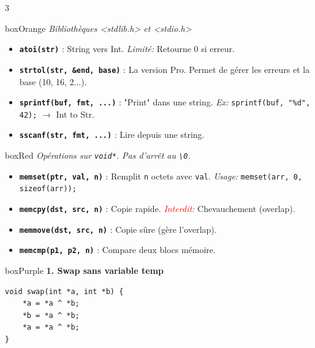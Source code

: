 \documentclass[10pt,landscape,a4paper]{article}
\begin{document}
\begin{multicols*}{3}
\begin{mybox}[CONVERSIONS]{boxOrange}
    \textit{Bibliothèques <stdlib.h> et <stdio.h>}
    \begin{itemize}[leftmargin=*, noitemsep]
        \item \textbf{\texttt{atoi(str)}} : String vers Int.
            \textit{Limité:} Retourne 0 si erreur.
        \item \textbf{\texttt{strtol(str, \&end, base)}} : La version Pro.
            Permet de gérer les erreurs et la base (10, 16, 2...).
        \item \textbf{\texttt{sprintf(buf, fmt, ...)}} : "Print" dans une string.
            \textit{Ex:} \texttt{sprintf(buf, "\%d", 42);} $\rightarrow$ Int to Str.
        \item \textbf{\texttt{sscanf(str, fmt, ...)}} : Lire depuis une string.
    \end{itemize}
\end{mybox}

\begin{mybox}{boxRed}
    \textit{Opérations sur \texttt{void*}. Pas d'arrêt au \texttt{\textbackslash0}.}
    \begin{itemize}[leftmargin=*, noitemsep]
        \item \textbf{\texttt{memset(ptr, val, n)}} : Remplit \texttt{n} octets avec \texttt{val}.
            \textit{Usage:} \texttt{memset(arr, 0, sizeof(arr));}
        \item \textbf{\texttt{memcpy(dst, src, n)}} : Copie rapide.
            \textit{\textcolor{red}{Interdit:}} Chevauchement (overlap).
        \item \textbf{\texttt{memmove(dst, src, n)}} : Copie sûre (gère l'overlap).
        \item \textbf{\texttt{memcmp(p1, p2, n)}} : Compare deux blocs mémoire.
    \end{itemize}
\end{mybox}

\begin{mybox}{boxPurple}
    \textbf{1. Swap sans variable temp}
    \begin{lstlisting}
void swap(int *a, int *b) {
    *a = *a ^ *b;
    *b = *a ^ *b;
    *a = *a ^ *b;
}
    \end{lstlisting}
    

\end{mybox}
\end{multicols*}
\end{document}
